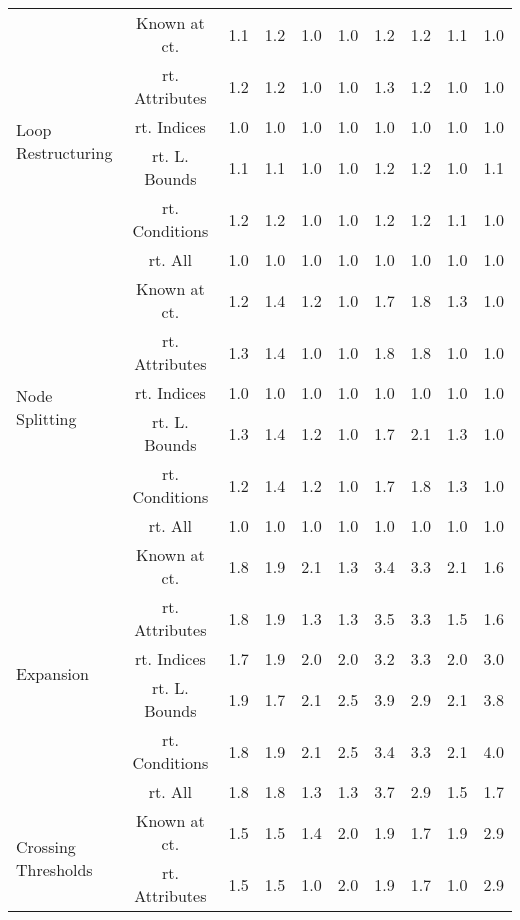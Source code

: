 \documentclass{article}
\begin{document}
\begin{longtable}{|p{2cm}|c|c|c|c|c|c|c|c|c|}
\hline
\multirow{6}{*}{ \parbox{2cm}{Loop\\Restructuring}} & Known at ct. & 1.1 & 1.2 & 1.0 & 1.0 & 1.2 & 1.2 & 1.1 & 1.0\\ \cline{2-10}
 & rt. Attributes & 1.2 & 1.2 & 1.0 & 1.0 & 1.3 & 1.2 & 1.0 & 1.0\\ \cline{2-10}
 & rt. Indices & 1.0 & 1.0 & 1.0 & 1.0 & 1.0 & 1.0 & 1.0 & 1.0\\ \cline{2-10}
 & rt. L. Bounds & 1.1 & 1.1 & 1.0 & 1.0 & 1.2 & 1.2 & 1.0 & 1.1\\ \cline{2-10}
 & rt. Conditions & 1.2 & 1.2 & 1.0 & 1.0 & 1.2 & 1.2 & 1.1 & 1.0\\ \cline{2-10}
 & rt. All & 1.0 & 1.0 & 1.0 & 1.0 & 1.0 & 1.0 & 1.0 & 1.0\\ \cline{2-10}
\hline
\multirow{6}{*}{ \parbox{2cm}{Node\\Splitting}} & Known at ct. & 1.2 & 1.4 & 1.2 & 1.0 & 1.7 & 1.8 & 1.3 & 1.0\\ \cline{2-10}
 & rt. Attributes & 1.3 & 1.4 & 1.0 & 1.0 & 1.8 & 1.8 & 1.0 & 1.0\\ \cline{2-10}
 & rt. Indices & 1.0 & 1.0 & 1.0 & 1.0 & 1.0 & 1.0 & 1.0 & 1.0\\ \cline{2-10}
 & rt. L. Bounds & 1.3 & 1.4 & 1.2 & 1.0 & 1.7 & 2.1 & 1.3 & 1.0\\ \cline{2-10}
 & rt. Conditions & 1.2 & 1.4 & 1.2 & 1.0 & 1.7 & 1.8 & 1.3 & 1.0\\ \cline{2-10}
 & rt. All & 1.0 & 1.0 & 1.0 & 1.0 & 1.0 & 1.0 & 1.0 & 1.0\\ \cline{2-10}
\hline
\multirow{6}{*}{ \parbox{2cm}{Expansion}} & Known at ct. & 1.8 & 1.9 & 2.1 & 1.3 & 3.4 & 3.3 & 2.1 & 1.6\\ \cline{2-10}
 & rt. Attributes & 1.8 & 1.9 & 1.3 & 1.3 & 3.5 & 3.3 & 1.5 & 1.6\\ \cline{2-10}
 & rt. Indices & 1.7 & 1.9 & 2.0 & 2.0 & 3.2 & 3.3 & 2.0 & 3.0\\ \cline{2-10}
 & rt. L. Bounds & 1.9 & 1.7 & 2.1 & 2.5 & 3.9 & 2.9 & 2.1 & 3.8\\ \cline{2-10}
 & rt. Conditions & 1.8 & 1.9 & 2.1 & 2.5 & 3.4 & 3.3 & 2.1 & 4.0\\ \cline{2-10}
 & rt. All & 1.8 & 1.8 & 1.3 & 1.3 & 3.7 & 2.9 & 1.5 & 1.7\\ \cline{2-10}
\hline
\multirow{6}{*}{ \parbox{2cm}{Crossing\\Thresholds}} & Known at ct. & 1.5 & 1.5 & 1.4 & 2.0 & 1.9 & 1.7 & 1.9 & 2.9\\ \cline{2-10}
 & rt. Attributes & 1.5 & 1.5 & 1.0 & 2.0 & 1.9 & 1.7 & 1.0 & 2.9\\ \cline{2-10}

\end{longtable}
\end{document}
